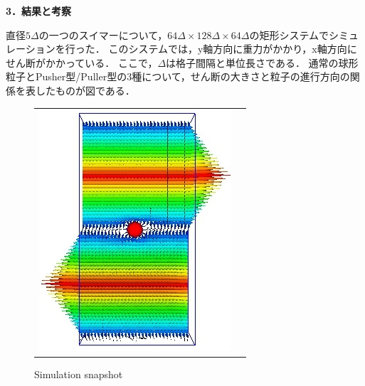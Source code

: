 \documentclass[twocolumns,10pt,a4j]{jarticle}
\begin{document}
  \noindent
  {\bf \large 3．結果と考察}
  \par
直径$5\Delta$の一つのスイマーについて，$64\Delta \times 128\Delta \times 64\Delta$の矩形システムでシミュレーションを行った．
このシステムでは，y軸方向に重力がかかり，x軸方向にせん断がかかっている．
ここで，$\Delta$は格子間隔と単位長さである．
通常の球形粒子とPusher型/Puller型の3種について，せん断の大きさと粒子の進行方向の関係を表したものが図である．
  \vspace{-3truemm}
  \begin{figure}[h]
    \begin{tabular}{cc}
      \hspace{-3truemm}
      \begin{minipage}[t]{0.44\hsize}
        \centering
        \includegraphics[width=30truemm]{./images/zig_zag.jpg}
        \vspace{-4truemm}
        \hspace{-2truemm}
        \caption{Simulation snapshot}
        \label{zigzag_image}
      \end{minipage}


\end{tabular}
\end{figure}
\end{document}
